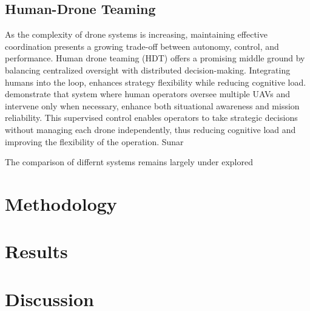 \documentclass[twoside]{article}
\begin{document}
\subsection{Human-Drone Teaming}

As the complexity of drone systems is increasing, maintaining effective coordination presents a growing trade-off between autonomy, control, and performance. Human drone teaming (HDT) offers a promising middle ground by balancing centralized oversight with distributed decision-making. Integrating humans into the loop, enhances strategy flexibility while reducing cognitive load. \citet{SAT_first} demonstrate that system where human operators oversee multiple UAVs and intervene only when necessary, enhance both situational awareness and mission reliability. This supervised control enables operators to take strategic decisions without managing each drone independently, thus reducing cognitive load and improving the flexibility of the operation.
Sunar







The comparison of differnt systems remains largely under explored


\section{Methodology}
\section{Results}
\section{Discussion}





\end{document}
